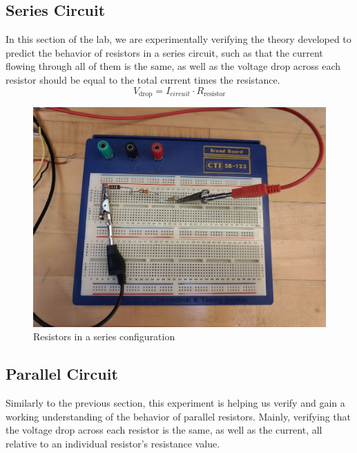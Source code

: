 \documentclass[titlepage]{article}
\begin{document}
        \subsection{Series Circuit}

        In this section of the lab, we are experimentally verifying the theory developed to predict the behavior of resistors in a series circuit, such as that the current flowing through all of them is the same, as well as the voltage drop across each resistor should be equal to the total current times the resistance.
        $$V_\text{drop}=I_{circuit} \cdot R_\text{resistor}$$

        \FloatBarrier
        \begin{figure}[hbt!]
            \centering
            \caption{Resistors in a series configuration}
    \includegraphics[scale=0.2]{procedure/series} 
        \end{figure}
        \FloatBarrier



        \FloatBarrier
        \subsection{Parallel Circuit}
        Similarly to the previous section, this experiment is helping us verify and gain a working understanding of the behavior of parallel resistors. Mainly, verifying that the voltage drop across each resistor is the same, as well as the current, all relative to an individual resistor's resistance value. 
\end{document}
